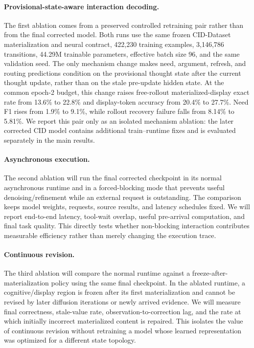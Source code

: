 \paragraph{Provisional-state-aware interaction decoding.}
The first ablation comes from a preserved controlled retraining pair rather than from the final corrected model. Both runs use the same frozen CID-Dataset materialization and neural contract, 422,230 training examples, 3,146,786 transitions, 44.29M trainable parameters, effective batch size 96, and the same validation seed. The only mechanism change makes need, argument, refresh, and routing predictions condition on the provisional thought state after the current thought update, rather than on the stale pre-update hidden state. At the common epoch-2 budget, this change raises free-rollout materialized-display exact rate from 13.6\% to 22.8\% and display-token accuracy from 20.4\% to 27.7\%. Need F1 rises from 1.9\% to 9.1\%, while rollout recovery failure falls from 8.14\% to 5.81\%. We report this pair only as an isolated mechanism ablation: the later corrected CID model contains additional train--runtime fixes and is evaluated separately in the main results.

\paragraph{Asynchronous execution.}
The second ablation will run the final corrected checkpoint in its normal asynchronous runtime and in a forced-blocking mode that prevents useful denoising/refinement while an external request is outstanding. The comparison keeps model weights, requests, source results, and latency schedules fixed. We will report end-to-end latency, tool-wait overlap, useful pre-arrival computation, and final task quality. This directly tests whether non-blocking interaction contributes measurable efficiency rather than merely changing the execution trace.

\paragraph{Continuous revision.}
The third ablation will compare the normal runtime against a freeze-after-materialization policy using the same final checkpoint. In the ablated runtime, a cognitive/display region is frozen after its first materialization and cannot be revised by later diffusion iterations or newly arrived evidence. We will measure final correctness, stale-value rate, observation-to-correction lag, and the rate at which initially incorrect materialized content is repaired. This isolates the value of continuous revision without retraining a model whose learned representation was optimized for a different state topology.

